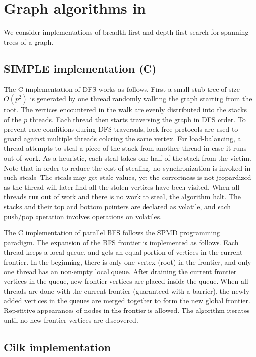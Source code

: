 \section{Graph algorithms in \XWS}\label{sec:Graph}

We consider implementations of breadth-first and depth-first search for spanning trees of a graph.


\subsection{SIMPLE implementation (C)}

The C implementation of DFS works as follows. First a small stub-tree
of size $O(p^2)$ is generated by one thread randomly walking the graph
starting from the root.  The vertices encountered in the walk are
evenly distributed into the stacks of the $p$ threads. Each thread
then starts traversing the graph in DFS order.  To prevent race
conditions during DFS traversals, lock-free protocols are used to
guard against multiple threads coloring the same vertex. For
load-balancing, a thread attempts to steal a piece of the stack from
another thread in case it runs out of work. As a heuristic, each steal
takes one half of the stack from the victim. Note that in order to
reduce the cost of stealing, no synchronization is invoked in such
steals. The steals may get stale values, yet the correctness is not
jeopardized as the thread will later find all the stolen vertices have
been visited.  When all threads run out of work and there is no work
to steal, the algorithm halt. The stacks and their top and bottom
pointers are declared as volatile, and each push/pop operation
involves operations on volatiles.

The C implementation of parallel BFS follows the SPMD programming
paradigm. The expansion of the BFS frontier is implemented as
follows. Each thread keeps a local queue, and gets an equal portion of
vertices in the current frontier. In the beginning, there is only one
vertex (root) in the frontier, and only one thread has an non-empty
local queue. After draining the current frontier vertices in the
queue, new frontier vertices are placed inside the queue. When all
threads are done with the current frontier (guaranteed with a
barrier), the newly-added vertices in the queues are merged together
to form the new global frontier. Repetitive appearances of nodes in
the frontier is allowed. The algorithm iterates until no new frontier
vertices are discovered.

\subsection{Cilk implementation}

